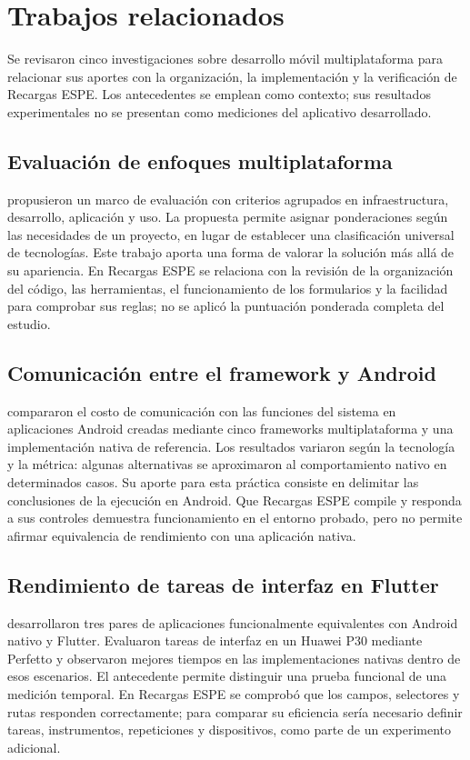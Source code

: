\documentclass[12pt,letterpaper]{article}
\begin{document}
\section{Trabajos relacionados}
Se revisaron cinco investigaciones sobre desarrollo móvil multiplataforma para relacionar sus aportes con la organización, la implementación y la verificación de Recargas ESPE. Los antecedentes se emplean como contexto; sus resultados experimentales no se presentan como mediciones del aplicativo desarrollado.

\subsection{Evaluación de enfoques multiplataforma}
\citet{rieger2019} propusieron un marco de evaluación con criterios agrupados en infraestructura, desarrollo, aplicación y uso. La propuesta permite asignar ponderaciones según las necesidades de un proyecto, en lugar de establecer una clasificación universal de tecnologías. Este trabajo aporta una forma de valorar la solución más allá de su apariencia. En Recargas ESPE se relaciona con la revisión de la organización del código, las herramientas, el funcionamiento de los formularios y la facilidad para comprobar sus reglas; no se aplicó la puntuación ponderada completa del estudio.

\subsection{Comunicación entre el framework y Android}
\citet{biornhansen2020} compararon el costo de comunicación con las funciones del sistema en aplicaciones Android creadas mediante cinco frameworks multiplataforma y una implementación nativa de referencia. Los resultados variaron según la tecnología y la métrica: algunas alternativas se aproximaron al comportamiento nativo en determinados casos. Su aporte para esta práctica consiste en delimitar las conclusiones de la ejecución en Android. Que Recargas ESPE compile y responda a sus controles demuestra funcionamiento en el entorno probado, pero no permite afirmar equivalencia de rendimiento con una aplicación nativa.

\subsection{Rendimiento de tareas de interfaz en Flutter}
\citet{bialkowski2022} desarrollaron tres pares de aplicaciones funcionalmente equivalentes con Android nativo y Flutter. Evaluaron tareas de interfaz en un Huawei P30 mediante Perfetto y observaron mejores tiempos en las implementaciones nativas dentro de esos escenarios. El antecedente permite distinguir una prueba funcional de una medición temporal. En Recargas ESPE se comprobó que los campos, selectores y rutas responden correctamente; para comparar su eficiencia sería necesario definir tareas, instrumentos, repeticiones y dispositivos, como parte de un experimento adicional.
\end{document}
